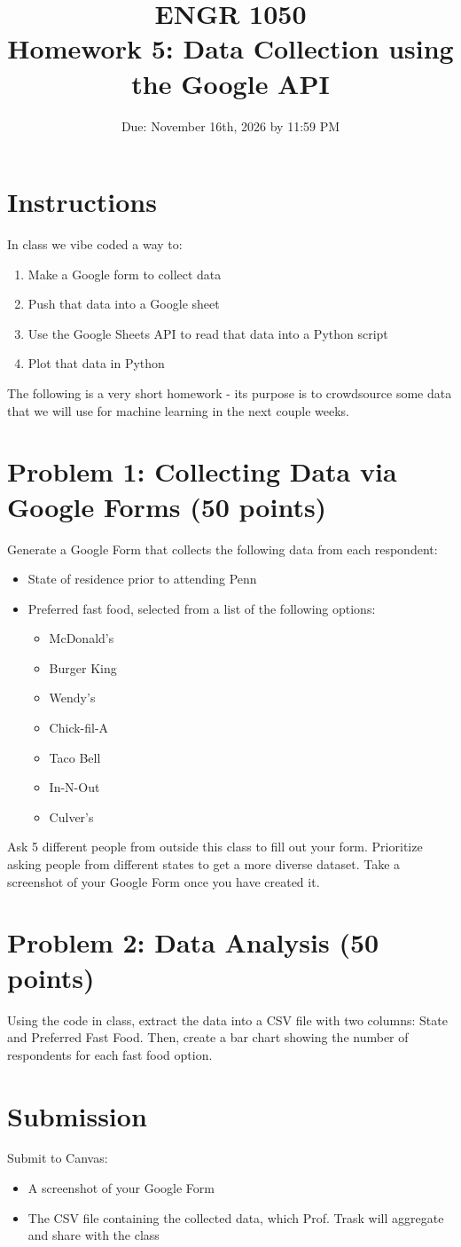 \documentclass[12pt]{article}
\title{ENGR 1050 \\ Homework 5: Data Collection using the Google API}
\author{Due: November 16th, 2026 by 11:59 PM}
\date{}
\begin{document}
\maketitle

\section*{Instructions}
In class we vibe coded a way to:
\begin{enumerate}
    \item Make a Google form to collect data
    \item Push that data into a Google sheet
    \item Use the Google Sheets API to read that data into a Python script
    \item Plot that data in Python
\end{enumerate}

The following is a very short homework - its purpose is to crowdsource some data that we will use for machine learning in the next couple weeks.

\section*{Problem 1: Collecting Data via Google Forms (50 points)}
Generate a Google Form that collects the following data from each respondent:
\begin{itemize}
    \item State of residence prior to attending Penn
    \item Preferred fast food, selected from a list of the following options:
    \begin{itemize}
        \item McDonald's
        \item Burger King
        \item Wendy's
        \item Chick-fil-A
        \item Taco Bell
        \item In-N-Out
        \item Culver's
    \end{itemize}
\end{itemize}
Ask 5 different people from outside this class to fill out your form. Prioritize asking people from different states to get a more diverse dataset. Take a screenshot of your Google Form once you have created it.

\section*{Problem 2: Data Analysis (50 points)}
Using the code in class, extract the data into a CSV file with two columns: State and Preferred Fast Food. Then, create a bar chart showing the number of respondents for each fast food option.

\section*{Submission}
Submit to Canvas:
\begin{itemize}
    \item A screenshot of your Google Form
    \item The CSV file containing the collected data, which Prof. Trask will aggregate and share with the class 
\end{itemize}
\end{document}
